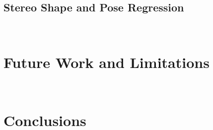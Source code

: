 \subsection{Stereo Shape and Pose Regression}
~\label{subsec:discussion_spp}

\section{Future Work and Limitations}
~\label{sec:discussion_limitations}




\section{Conclusions}
~\label{sec:discussion_conclusions}